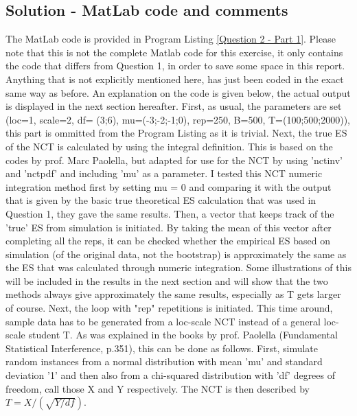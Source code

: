 \documentclass[12pt]{article}
\begin{document}
\subsection*{Solution - MatLab code and comments}
The MatLab code is provided in Program Listing \ref{Question 2 - Part 1}. \newline 
Please note that this is not the complete Matlab code for this exercise, it only contains the code that differs from Question 1, in order to save some space in this report. Anything that is not explicitly mentioned here, has just been coded in the exact same way as before. An explanation on the code is given below, the actual output is displayed in the next section hereafter.\newline \newline
First, as usual, the parameters are set (loc=1, scale=2, df= (3;6), mu=(-3;-2;-1;0), rep=250, B=500, T=(100;500;2000)), this part is ommitted from the Program Listing as it is trivial. Next, the true ES of the NCT is calculated by using the integral definition. This is based on the codes by prof. Marc Paolella, but adapted for use for the NCT by using 'nctinv' and 'nctpdf' and including 'mu' as a parameter. I tested this NCT numeric integration method first by setting mu = 0 and comparing it with the output that is given by the basic true theoretical ES calculation that was used in Question 1, they gave the same results. \newline
Then, a vector that keeps track of the 'true' ES from simulation is initiated. By taking the mean of this vector after completing all the reps, it can be checked whether the empirical ES based on simulation (of the original data, not the bootstrap) is approximately the same as the ES that was calculated through numeric integration. Some illustrations of this will be included in the results in the next section and will show that the two methods always give approximately the same results, especially as T gets larger of course. \newline\newline
Next, the loop with "rep" repetitions is initiated. This time around, sample data has to be generated from a loc-scale NCT instead of a general loc-scale student T. As was explained in the books by prof. Paolella (Fundamental Statistical Interference, p.351), this can be done as follows. First, simulate random instances from a normal distribution with mean 'mu' and standard deviation '1' and then also from a chi-squared distribution with 'df' degrees of freedom, call those X and Y respectively. The NCT is then described by $T = X / (\sqrt{Y/df} )$.  
\end{document}
